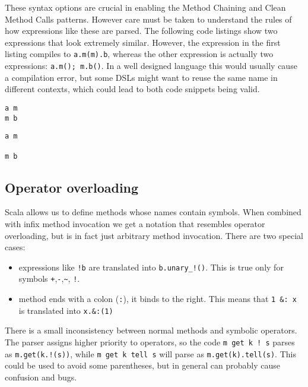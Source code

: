 These syntax options are crucial in enabling the Method Chaining and Clean Method Calls patterns.
However care must be taken to understand the rules of how expressions like these are parsed.
The following code listings show two expressions that look extremely similar.
However, the expression in the first listing compiles to \texttt{a.m(m).b}, whereas the other expression is actually two expressions: \texttt{a.m(); m.b()}.
In a well designed language this would usually cause a compilation error, but some DSLs might want to reuse the same name in different contexts, which could lead to both code snippets being valid.

\begin{minipage}[t]{0.4\textwidth}
\begin{lstlisting}[caption=One expression]
a m
m b
\end{lstlisting}
\end{minipage}
\hfill
\begin{minipage}[t]{0.4\textwidth}
\begin{lstlisting}[caption=Two expressions]
a m

m b
\end{lstlisting}
\end{minipage}

\subsection{Operator overloading}

Scala allows us to define methods whose names contain symbols.
When combined with infix method invocation we get a notation that resembles operator overloading, but is in fact just arbitrary method invocation.
There are two special cases: 
\begin{itemize}
	\item expressions like \texttt{!b} are translated into \texttt{b.unary\_!()}.
This is true only for symbols \texttt{+},\texttt{-},\texttt{\~}, \texttt{!}.
	\item method ends with a colon (\texttt{:}), it binds to the right.
This means that \texttt{1 \&: x} is translated into \texttt{x.\&:(1)}
\end{itemize}

There is a small inconsistency between normal methods and symbolic operators.
The parser assigns higher priority to operators, so the code \texttt{m get k ! s} parses as \texttt{m.get(k.!(s))}, while \texttt{m get k tell s} will parse as \texttt{m.get(k).tell(s)}.
This could be used to avoid some parentheses, but in general can probably cause confusion and bugs.

